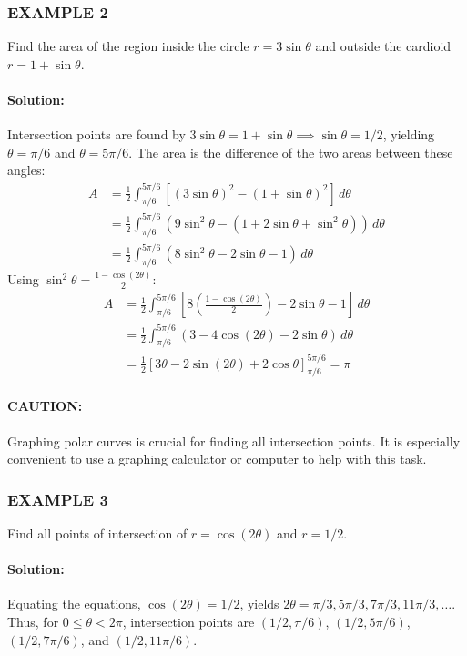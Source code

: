 \documentclass{article}
\begin{document}
\subsubsection*{EXAMPLE 2}
Find the area of the region inside the circle $r = 3\sin\theta$ and outside the cardioid $r = 1 + \sin\theta$.

\paragraph{Solution:} Intersection points are found by $3\sin\theta = 1 + \sin\theta \implies \sin\theta = 1/2$, yielding $\theta = \pi/6$ and $\theta = 5\pi/6$. The area is the difference of the two areas between these angles:
\begin{align*}
    A &= \frac{1}{2} \int_{\pi/6}^{5\pi/6} \left[ (3\sin\theta)^2 - (1 + \sin\theta)^2 \right] \, d\theta \\
    &= \frac{1}{2} \int_{\pi/6}^{5\pi/6} (9\sin^2\theta - (1 + 2\sin\theta + \sin^2\theta)) \, d\theta \\
    &= \frac{1}{2} \int_{\pi/6}^{5\pi/6} (8\sin^2\theta - 2\sin\theta - 1) \, d\theta
\end{align*}
Using $\sin^2\theta = \frac{1 - \cos(2\theta)}{2}$:
\begin{align*}
    A &= \frac{1}{2} \int_{\pi/6}^{5\pi/6} \left[ 8\left(\frac{1 - \cos(2\theta)}{2}\right) - 2\sin\theta - 1 \right] \, d\theta \\
    &= \frac{1}{2} \int_{\pi/6}^{5\pi/6} (3 - 4\cos(2\theta) - 2\sin\theta) \, d\theta \\
    &= \frac{1}{2} \left[ 3\theta - 2\sin(2\theta) + 2\cos\theta \right]_{\pi/6}^{5\pi/6} = \pi
\end{align*}

\paragraph{CAUTION:} Graphing polar curves is crucial for finding all intersection points. It is especially convenient to use a graphing calculator or computer to help with this task.

\subsubsection*{EXAMPLE 3}
Find all points of intersection of $r = \cos(2\theta)$ and $r = 1/2$.

\paragraph{Solution:} Equating the equations, $\cos(2\theta) = 1/2$, yields $2\theta = \pi/3, 5\pi/3, 7\pi/3, 11\pi/3, \dots$. Thus, for $0 \le \theta < 2\pi$, intersection points are $(1/2, \pi/6)$, $(1/2, 5\pi/6)$, $(1/2, 7\pi/6)$, and $(1/2, 11\pi/6)$.
\end{document}
